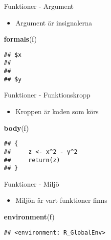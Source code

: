 \documentclass[
  11pt,
  ignorenonframetext,
]{beamer}
\newenvironment{Shaded}{\begin{snugshade}}{\end{snugshade}}
\newcommand{\FunctionTok}[1]{\textcolor[rgb]{0.13,0.29,0.53}{\textbf{#1}}}
\newcommand{\NormalTok}[1]{#1}
\providecommand{\tightlist}{%
  \setlength{\itemsep}{0pt}\setlength{\parskip}{0pt}}
\begin{document}
\begin{frame}[fragile]{Funktioner - Argument}
\label{funktioner---argument}
\begin{itemize}
\tightlist
\item
  Argument är insignalerna
\end{itemize}

\begin{Shaded}
\begin{Highlighting}[]
\FunctionTok{formals}\NormalTok{(f)}
\end{Highlighting}
\end{Shaded}

\begin{verbatim}
## $x
## 
## 
## $y
\end{verbatim}
\end{frame}

\begin{frame}[fragile]{Funktioner - Funktionskropp}
\label{funktioner---funktionskropp}
\begin{itemize}
\tightlist
\item
  Kroppen är koden som körs
\end{itemize}

\begin{Shaded}
\begin{Highlighting}[]
\FunctionTok{body}\NormalTok{(f)}
\end{Highlighting}
\end{Shaded}

\begin{verbatim}
## {
##     z <- x^2 - y^2
##     return(z)
## }
\end{verbatim}
\end{frame}

\begin{frame}[fragile]{Funktioner - Miljö}
\label{funktioner---miljuxf6}
\begin{itemize}
\tightlist
\item
  Miljön är vart funktioner finns
\end{itemize}

\begin{Shaded}
\begin{Highlighting}[]
\FunctionTok{environment}\NormalTok{(f)}
\end{Highlighting}
\end{Shaded}

\begin{verbatim}
## <environment: R_GlobalEnv>
\end{verbatim}
\end{frame}
\end{document}
